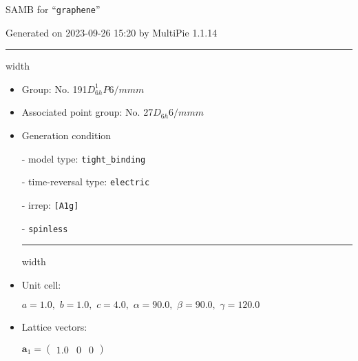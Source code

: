 \documentclass[fleqn,10pt,landscape]{article}
\begin{document}
\setcounter{MaxMatrixCols}{16}

\setlength{\baselineskip}{16pt}
\footnotesize
\begin{center}
\LARGE
SAMB for ``\texttt{graphene}''
\end{center}
\begin{flushright}
Generated on 2023-09-26 15:20 by MultiPie 1.1.14
\end{flushright}
\vspace{1cm}


 \hfil \hrule height 1mm width \textwidth \hfil

\begin{itemize}
\item Group: No. 191\quad$D_{6h}^{1}$\quad$P6/mmm$\quad[ hexagonal ]

\item Associated point group: No. 27\quad$D_{6h}$\quad$6/mmm$\quad[ hexagonal ]

\vspace{5mm}

\item Generation condition

\quad - model type: \texttt{tight_binding}

\quad - time-reversal type: \texttt{electric}

\quad - irrep: \texttt{[A1g]}

\quad - \texttt{spinless}


 \hfil \hrule height 1mm width \textwidth \hfil

\item Unit cell:

\quad $a=1.0,\,\, b=1.0,\,\, c=4.0,\,\, \alpha=90.0,\,\, \beta=90.0,\,\, \gamma=120.0$

\item Lattice vectors:

\quad $\bm{a}_1=\begin{pmatrix} 1.0 & 0 & 0 \end{pmatrix}$


\end{itemize}
\end{document}
